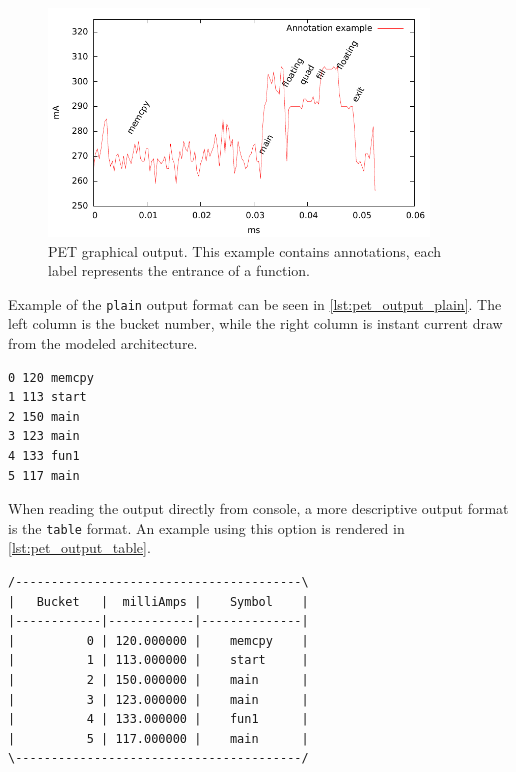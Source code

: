 \begin{figure}[htb]
    \centering
    \includegraphics[width=0.9\textwidth]{figs/annot.pdf}
    \caption{PET graphical output. This example contains annotations, each label
    represents the entrance of a function.}
    \label{fig:annot}
\end{figure}

Example of the \texttt{plain} output format can be seen in
\autoref{lst:pet_output_plain}. The left column is the bucket number, while the
right column is instant current draw from the modeled architecture.

\begin{lstlisting}[numbers=none,float=hbt,label={lst:pet_output_plain},caption={PET plain output with function annotations.}]
0 120 memcpy
1 113 start
2 150 main
3 123 main
4 133 fun1
5 117 main
\end{lstlisting}

When reading the output directly from console, a more descriptive output format
is the \texttt{table} format. An example using this option is rendered in
\autoref{lst:pet_output_table}.

\begin{lstlisting}[numbers=none,float=hbt,label={lst:pet_output_table},caption={PET table output with function annotations.}]
/----------------------------------------\
|   Bucket   |  milliAmps |    Symbol    |
|------------|------------|--------------|
|          0 | 120.000000 |    memcpy    |
|          1 | 113.000000 |    start     |
|          2 | 150.000000 |    main      |
|          3 | 123.000000 |    main      |
|          4 | 133.000000 |    fun1      |
|          5 | 117.000000 |    main      |
\----------------------------------------/
\end{lstlisting}


